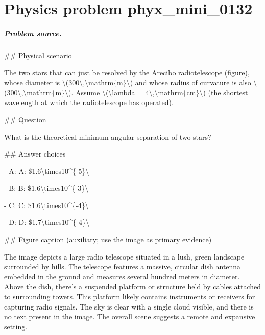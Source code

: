 
\chapter{Physics problem phyx\_mini\_0132}
\label{ch:PhyXMiniProblems_problem_phyx_mini_0132}

\paragraph{Problem source.}
\#\# Physical scenario

The two stars that can just be resolved by the Arecibo radiotelescope (figure), whose diameter is \textbackslash{}(300\textbackslash{},\textbackslash{}mathrm\{m\}\textbackslash{}) and whose radius of curvature is also \textbackslash{}(300\textbackslash{},\textbackslash{}mathrm\{m\}\textbackslash{}). Assume \textbackslash{}(\textbackslash{}lambda = 4\textbackslash{},\textbackslash{}mathrm\{cm\}\textbackslash{}) (the shortest wavelength at which the radiotelescope has operated).

\#\# Question

What is the theoretical minimum angular separation of two stars?

\#\# Answer choices

- A: A: \$1.6\textbackslash{}times10\textasciicircum{}\{-5\}\textbackslash{}

- B: B: \$1.6\textbackslash{}times10\textasciicircum{}\{-3\}\textbackslash{}

- C: C: \$1.6\textbackslash{}times10\textasciicircum{}\{-4\}\textbackslash{}

- D: D: \$1.7\textbackslash{}times10\textasciicircum{}\{-4\}\textbackslash{}

\#\# Figure caption (auxiliary; use the image as primary evidence)

The image depicts a large radio telescope situated in a lush, green landscape surrounded by hills. The telescope features a massive, circular dish antenna embedded in the ground and measures several hundred meters in diameter. Above the dish, there's a suspended platform or structure held by cables attached to surrounding towers. This platform likely contains instruments or receivers for capturing radio signals. The sky is clear with a single cloud visible, and there is no text present in the image. The overall scene suggests a remote and expansive setting.

